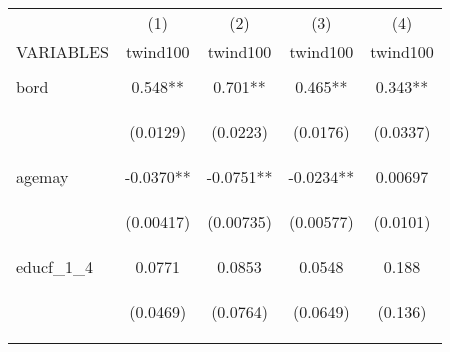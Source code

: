 \documentclass[]{article}
\begin{document}
\begin{center}
\begin{tabular}{lcccc} \hline
 & (1) & (2) & (3) & (4) \\
VARIABLES & twind100 & twind100 & twind100 & twind100 \\ \hline
\vspace{4pt} & \begin{footnotesize}\end{footnotesize} & \begin{footnotesize}\end{footnotesize} & \begin{footnotesize}\end{footnotesize} & \begin{footnotesize}\end{footnotesize} \\
bord & 0.548** & 0.701** & 0.465** & 0.343** \\
\vspace{4pt} & \begin{footnotesize}(0.0129)\end{footnotesize} & \begin{footnotesize}(0.0223)\end{footnotesize} & \begin{footnotesize}(0.0176)\end{footnotesize} & \begin{footnotesize}(0.0337)\end{footnotesize} \\
agemay & -0.0370** & -0.0751** & -0.0234** & 0.00697 \\
\vspace{4pt} & \begin{footnotesize}(0.00417)\end{footnotesize} & \begin{footnotesize}(0.00735)\end{footnotesize} & \begin{footnotesize}(0.00577)\end{footnotesize} & \begin{footnotesize}(0.0101)\end{footnotesize} \\
educf\_1\_4 & 0.0771 & 0.0853 & 0.0548 & 0.188 \\
\vspace{4pt} & \begin{footnotesize}(0.0469)\end{footnotesize} & \begin{footnotesize}(0.0764)\end{footnotesize} & \begin{footnotesize}(0.0649)\end{footnotesize} & \begin{footnotesize}(0.136)\end{footnotesize} \\

\end{tabular}
\end{center}
\end{document}
